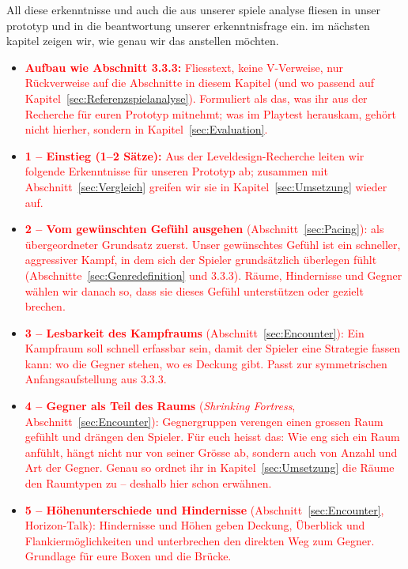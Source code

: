 \documentclass[../Main.tex]{subfiles}
\begin{document}
All diese erkenntnisse und auch die aus unserer spiele analyse fliesen in unser prototyp und in die beantwortung unserer erkenntnisfrage ein. im nächsten kapitel zeigen wir, wie genau wir das anstellen möchten.

\begin{itemize}[leftmargin=1.5cm]
    \item \textcolor{red}{\textbf{Aufbau wie Abschnitt 3.3.3:} Fliesstext, keine V-Verweise, nur Rückverweise auf die Abschnitte in diesem Kapitel (und wo passend auf Kapitel~\ref{sec:Referenzspielanalyse}). Formuliert als das, was ihr aus der Recherche für euren Prototyp mitnehmt; was im Playtest herauskam, gehört nicht hierher, sondern in Kapitel~\ref{sec:Evaluation}.}
    \item \textcolor{red}{\textbf{1 -- Einstieg (1--2 Sätze):} Aus der Leveldesign-Recherche leiten wir folgende Erkenntnisse für unseren Prototyp ab; zusammen mit Abschnitt~\ref{sec:Vergleich} greifen wir sie in Kapitel~\ref{sec:Umsetzung} wieder auf.}
    \item \textcolor{red}{\textbf{2 -- Vom gewünschten Gefühl ausgehen} (Abschnitt~\ref{sec:Pacing}): als übergeordneter Grundsatz zuerst. Unser gewünschtes Gefühl ist ein schneller, aggressiver Kampf, in dem sich der Spieler grundsätzlich überlegen fühlt (Abschnitte~\ref{sec:Genredefinition} und 3.3.3). Räume, Hindernisse und Gegner wählen wir danach so, dass sie dieses Gefühl unterstützen oder gezielt brechen.}
    \item \textcolor{red}{\textbf{3 -- Lesbarkeit des Kampfraums} (Abschnitt~\ref{sec:Encounter}): Ein Kampfraum soll schnell erfassbar sein, damit der Spieler eine Strategie fassen kann: wo die Gegner stehen, wo es Deckung gibt. Passt zur symmetrischen Anfangsaufstellung aus 3.3.3.}
    \item \textcolor{red}{\textbf{4 -- Gegner als Teil des Raums} (\textit{Shrinking Fortress}, Abschnitt~\ref{sec:Encounter}): Gegnergruppen verengen einen grossen Raum gefühlt und drängen den Spieler. Für euch heisst das: Wie eng sich ein Raum anfühlt, hängt nicht nur von seiner Grösse ab, sondern auch von Anzahl und Art der Gegner. Genau so ordnet ihr in Kapitel~\ref{sec:Umsetzung} die Räume den Raumtypen zu -- deshalb hier schon erwähnen.}
    \item \textcolor{red}{\textbf{5 -- Höhenunterschiede und Hindernisse} (Abschnitt~\ref{sec:Encounter}, Horizon-Talk): Hindernisse und Höhen geben Deckung, Überblick und Flankiermöglichkeiten und unterbrechen den direkten Weg zum Gegner. Grundlage für eure Boxen und die Brücke.}

\end{itemize}
\end{document}
